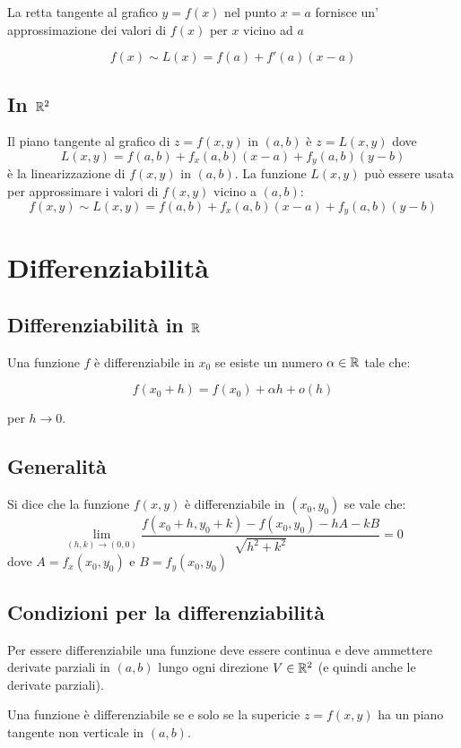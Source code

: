 La retta tangente al grafico $y=f(x)$ nel punto $x=a$ fornisce un' approssimazione dei valori di $f(x)$ per $x$ vicino ad $a$

$$f(x) \sim L(x) = f(a) + f'(a)(x-a)$$

\subsection{In $\mathbb{R}^2$}

Il piano tangente al grafico di $z = f(x,y)$ in $(a,b)$ è $z = L(x,y)$ dove $$L(x,y) = f(a,b) + f_x(a,b)(x-a) + f_y(a,b)(y-b)$$ è la linearizzazione di $f(x,y)$ in $(a,b)$. La funzione $L(x,y)$ può essere usata per approssimare i valori di $f(x,y)$ vicino a $(a,b)$:
$$
f(x,y) \sim L(x,y) = f(a,b) + f_x(a,b)(x-a) + f_y(a,b)(y-b)
$$
\section{Differenziabilità}

\subsection{Differenziabilità in $\mathbb{R}$}

Una funzione $f$ è differenziabile in $x_0$ se esiste un numero $\alpha \in \mathbb{R}$ tale che:

$$f(x_0+h)=f(x_0)+\alpha h + o(h)$$

per $h \to 0$.

\subsection{Generalità}

Si dice che la funzione $f(x,y)$ è differenziabile in $(x_0,y_0)$ se vale che:
$$
\lim_{(h,k)\to (0,0)} \frac{f(x_0+h,y_0+k) - f(x_0,y_0) - h A - k B}{\sqrt{h^2+k^2}} = 0
$$
dove $A=f_x(x_0,y_0)$ e $B=f_y(x_0,y_0)$

\subsection{Condizioni per la differenziabilità}

Per essere differenziabile una funzione deve essere continua e deve ammettere derivate parziali in $(a,b)$ lungo ogni direzione $V \in \mathbb{R}^2$ (e quindi anche le derivate parziali).

Una funzione è differenziabile se e solo se la supericie $z=f(x,y)$ ha un piano tangente non verticale in $(a,b)$.


